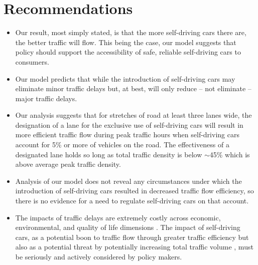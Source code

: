 \section{Recommendations} \label{sec:recommendations}

\begin{itemize}
    \item Our result, most simply stated, is that the more self-driving cars there are, the better traffic will flow.  This being the case, our model suggests that policy should support the accessibility of safe, reliable self-driving cars to consumers. 
    \item Our model predicts that while the introduction of self-driving cars may eliminate minor traffic delays but, at best, will only reduce -- not eliminate -- major traffic delays.
    \item Our analysis suggests that for stretches of road at least three lanes wide, the designation of a lane for the exclusive use of self-driving cars will result in more efficient traffic flow during peak traffic hours when self-driving cars account for 5\% or more of vehicles on the road. The effectiveness of a designated lane holds so long as total traffic density is below $\sim$45\% which is above average peak traffic density.
    \item Analysis of our model does not reveal any circumstances under which the introduction of self-driving cars resulted in decreased traffic flow efficiency, so there is no evidence for a need to regulate self-driving cars on that account.
	\item The impacts of traffic delays are extremely costly across economic, environmental, and quality of life dimensions \cite{Schrank20152015Scorecard}. The impact of self-driving cars, as a potential boon to traffic flow through greater traffic efficiency but also as a potential threat by potentially increasing total traffic volume \cite{Org2014Www.vtpi.orgPlanning}, must be seriously and actively considered by policy makers.
\end{itemize}